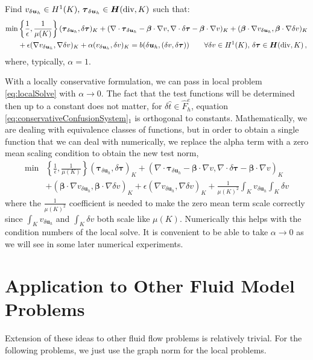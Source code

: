 \documentclass[letterpaper]{article}
\def\btau{\boldsymbol\tau}
\def\bbeta{\boldsymbol\beta}
\newcommand{\bs}[1]{\boldsymbol{#1}}
\newcommand{\bfH}{\mbox{\boldmath $H$}}
\newcommand{\HdivK}{\bfH(\text{div},K)}
\newcommand{\HOneK}{H^{1}(K)}
\newcommand{\vdeltau}{v_{\delta\bs u_h}}
\newcommand{\taudeltau}{\btau_{\delta\bs u_h}}
\begin{document}
Find $\vdeltau\in\HOneK,\,\taudeltau\in\HdivK$ such that:
\begin{align}
\min&\left\{\frac{1}{\epsilon},\frac{1}{\mu(K)}\right\}(\taudeltau,\delta\btau)_K
+(\nabla\cdot\taudeltau-\bbeta\cdot\nabla
v,\nabla\cdot\delta\btau-\bbeta\cdot\nabla v)_K
+(\bbeta\cdot\nabla\vdeltau,\bbeta\cdot\nabla \delta v)_K\nonumber\\
&+\epsilon(\nabla\vdeltau,\nabla \delta v)_K
+\alpha(\vdeltau,\delta v)_K
=b(\delta\bs u_h,(\delta v,\delta\btau))
\quad\quad\forall\delta v\in\HOneK,\,\delta\btau\in\HdivK\,,
\label{eq:localSolve}
\end{align}
where, typically, $\alpha=1$.

With a locally conservative formulation, we can pass in local problem
\eqref{eq:localSolve} with $\alpha\rightarrow0$. The fact that the test
functions will be determined then up to a constant does not matter, for
$\delta\hat t\in\hat F_h^e$, equation
\eqref{eq:conservativeConfusionSystem}$_1$ is orthogonal to constants.
Mathematically, we are dealing with equivalence classes of functions, but in
order to obtain a single function that we can deal with numerically, we
replace the alpha term with a zero mean scaling condition to obtain the new
test norm,
\begin{align}
\min&\left\{\frac{1}{\epsilon},\frac{1}{\mu(K)}\right\}(\taudeltau,\delta\btau)_K
+(\nabla\cdot\taudeltau-\bbeta\cdot\nabla
v,\nabla\cdot\delta\btau-\bbeta\cdot\nabla v)_K\\
&+(\bbeta\cdot\nabla\vdeltau,\bbeta\cdot\nabla \delta v)_K\nonumber
+\epsilon(\nabla\vdeltau,\nabla \delta v)_K
+\frac{1}{\mu(K)^2}\int_K\vdeltau\int_K\delta v
\label{eq:localSolveMod}
\end{align}
where the $\frac{1}{\mu(K)^2}$ coefficient is needed to make the zero mean term
scale correctly since $\int_K\vdeltau$ and $\int_K\delta v$ both scale like
$\mu(K)$. Numerically this helps with the condition
numbers of the local solve.
It is convenient to be able to take $\alpha\rightarrow0$ as we will see in
some later numerical experiments.

\section{Application to Other Fluid Model Problems}
Extension of these ideas to other fluid flow problems is relatively trivial.
For the following problems, we just use the graph norm for the local problems.
\end{document}
